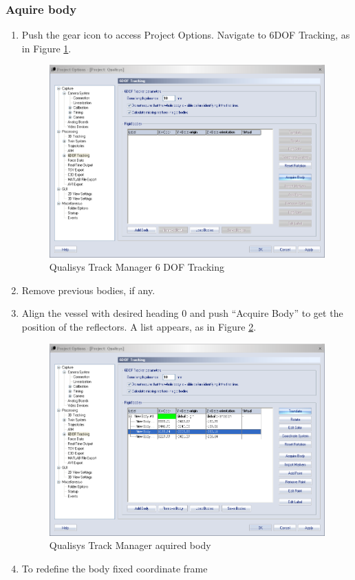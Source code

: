 \documentclass[a4paper,english]{report}
\begin{document}
\subsubsection*{Aquire body}
\begin{enumerate}
	\item Push the gear icon to access Project Options. Navigate to 6DOF Tracking,
	as in Figure \ref{fig:Qualisys-Track-Manager6DOF}.
	\begin{figure}[!h]
		\centering \includegraphics[width=1\textwidth]{fig/qualisys_6dof} \caption{\label{fig:Qualisys-Track-Manager6DOF}Qualisys Track Manager 6 DOF
			Tracking}
	\end{figure}
	\item Remove previous bodies, if any.
	\item Align the vessel with desired heading 0 and push ``Acquire Body''
	to get the position of the reflectors. A list appears, as in Figure
	\ref{fig:Qualisys-Track-ManagerAquiredBody}. 
	\begin{figure}[!h]
		\centering \includegraphics[width=1\textwidth]{fig/qualisys_orientating}
		\caption{\label{fig:Qualisys-Track-ManagerAquiredBody}Qualisys Track Manager
			aquired body}
	\end{figure}
	\item To redefine the body fixed coordinate frame 
	

\end{enumerate}
\end{document}
